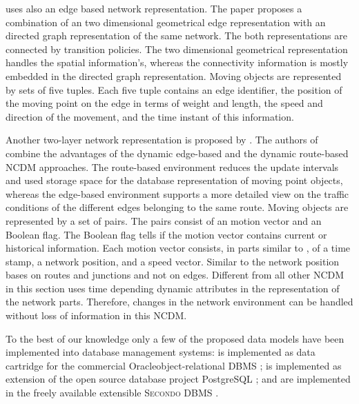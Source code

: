 \documentclass[a4paper]{article}
\newcommand{\secondo}{\textsc{Secondo}}
\begin{document}
\cite{NetworkJensen} uses also an edge based network representation. The paper
proposes a combination of an two dimensional geometrical edge representation with
an directed graph representation of the same network. The both representations
are connected by transition policies. The two dimensional
geometrical representation handles the spatial information's, whereas the 
connectivity
information is mostly embedded in the directed graph representation.
Moving objects are represented by sets of five tuples. Each five tuple contains
an edge identifier, the position of the moving point on the edge
in terms of weight and length, the speed and direction of the movement, and
the time instant of this information.

Another two-layer network representation is proposed by 
\cite{DynamicTransportNetworkDing}.
The authors of \cite{DynamicTransportNetworkDing} combine the advantages of the
dynamic edge-based \cite{DynNetworkModEdgeGueting} and the dynamic route-based
\cite{DynNetworkModRouteGueting} NCDM approaches. The route-based environment
reduces the update intervals and used storage space for the database representation
of moving point objects, whereas the edge-based environment supports
a more detailed view on the traffic conditions of the different edges belonging
to the same route. Moving objects are represented by a set of pairs. The pairs
consist of an motion vector and an Boolean flag. The Boolean flag tells if the
motion vector contains current or historical information. Each motion vector
consists, in parts similar to \cite{NetworkJensen}, of a time stamp, a network
position, and a speed vector. Similar to \cite{NetworkGueting} the network
position bases on routes and junctions and not on edges. Different from all
other NCDM in this section \cite{DynamicTransportNetworkDing}
uses time depending dynamic attributes in the representation of the network parts.
Therefore, changes in the network environment can be handled without loss of
information in this NCDM.

To the best of our knowledge only a few of the proposed data models have been
implemented into database management systems: \cite{STAUPelekis} is implemented
as data cartridge \cite{HERMESMDCPelekis, HERMESPelekis} for the commercial
Oracle\textregistered object-relational DBMS \cite{oracle};
\cite{DynamicTransportNetworkDing} is implemented as extension of the open source
database project PostgreSQL \cite{PostgreSQL}; \cite{DataModelDataStructureGueting}
and \cite{NetworkGueting} are implemented in the freely available extensible
\secondo{} DBMS \cite{SecondoPlatformPrototypingGueting}.
\end{document}

